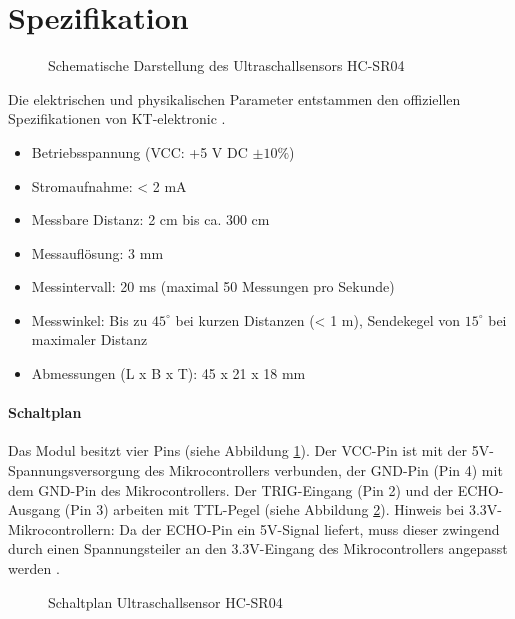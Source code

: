 \section{Spezifikation}


\begin{figure}[htbp]
	\centering
	
	\caption{Schematische Darstellung des Ultraschallsensors HC-SR04}
	\label{fig:hcsr04_tikz}
\end{figure}

	Die elektrischen und physikalischen Parameter entstammen den offiziellen Spezifikationen von KT-elektronic \cite{KT:2012}.
	\begin{itemize}
		\item Betriebsspannung (VCC: +5 V DC $\pm 10\%$)
		\item Stromaufnahme: < 2 mA
		\item Messbare Distanz: 2 cm bis ca. 300 cm 
		\item Messauflösung: 3 mm
		\item Messintervall: 20 ms (maximal 50 Messungen pro Sekunde)
		\item Messwinkel: Bis zu $45^\circ$ bei kurzen Distanzen (< 1 m), Sendekegel von $15^\circ$ bei maximaler Distanz
		\item Abmessungen (L x B x T): 45 x 21 x 18 mm
	\end{itemize}



\paragraph{Schaltplan}
Das Modul besitzt vier Pins (siehe Abbildung \ref{fig:hcsr04_tikz}). Der VCC-Pin ist mit der 5V-Spannungsversorgung des Mikrocontrollers verbunden, der GND-Pin (Pin 4) mit dem GND-Pin des Mikrocontrollers. Der TRIG-Eingang (Pin 2) und der ECHO-Ausgang (Pin 3) arbeiten mit TTL-Pegel  (siehe Abbildung \ref{fig:hcsr04_schaltplan_tikz}). 
Hinweis bei 3.3V-Mikrocontrollern: Da der ECHO-Pin ein 5V-Signal liefert, muss dieser zwingend durch einen Spannungsteiler an den 3.3V-Eingang des Mikrocontrollers angepasst werden \cite{KT:2012}.

\begin{figure}[htbp]
	\centering
	
	\caption{Schaltplan Ultraschallsensor HC-SR04}
	\label{fig:hcsr04_schaltplan_tikz}
\end{figure}

